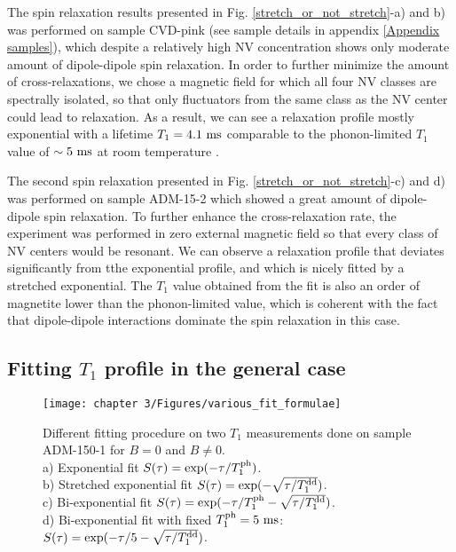 \documentclass[a4paper, 11pt]{report}
\begin{document}
The spin relaxation results presented in Fig. \ref{stretch_or_not_stretch}-a) and b) was performed on sample CVD-pink (see sample details in appendix \ref{Appendix samples}), which despite a relatively high NV concentration shows only moderate amount of dipole-dipole spin relaxation. In order to further minimize the amount of cross-relaxations, we chose a magnetic field for which all four NV classes are spectrally isolated, so that only fluctuators from the same class as the NV center could lead to relaxation. As a result, we can see a relaxation profile mostly exponential with a lifetime $T_1=4.1\ \rm ms$ comparable to the phonon-limited $T_1$ value of $\sim 5\ \rm ms$ at room temperature \citep{jarmola2012temperature}.

The second spin relaxation presented in Fig. \ref{stretch_or_not_stretch}-c) and d) was performed on sample ADM-15-2 which showed a great amount of dipole-dipole spin relaxation. To further enhance the cross-relaxation rate, the experiment was performed in zero external magnetic field so that every class of NV centers would be resonant. We can observe a relaxation profile that deviates significantly from tthe exponential profile, and which is nicely fitted by a stretched exponential. The $T_1$ value obtained from the fit is also an order of magnetite lower than the phonon-limited value, which is coherent with the fact that dipole-dipole interactions dominate the spin relaxation in this case.

\subsection{Fitting $T_1$ profile in the general case}

\begin{figure}[h]
\centering
\texttt{[image: chapter 3/Figures/various\_fit\_formulae]}
\caption{Different fitting procedure on two $T_1$ measurements done on sample ADM-150-1 for $B=0$ and $B\neq0$. \\ a) Exponential fit $S(\tau)=\exp (-\tau/T_1^{\rm ph})$. \\ b) Stretched exponential fit $S(\tau)=\exp (-\sqrt{\tau/T_1^{\rm dd}})$. \\ c) Bi-exponential fit $S(\tau)=\exp (-\tau/T_1^{\rm ph} -\sqrt{\tau/T_1^{\rm dd}})$. \\ d) Bi-exponential fit with fixed $T_1^{\rm ph}=5\ \rm ms$: $S(\tau)=\exp (-\tau/5 -\sqrt{\tau/T_1^{\rm dd}})$.}
\label{various_fit_formulae}
\end{figure}
\end{document}
